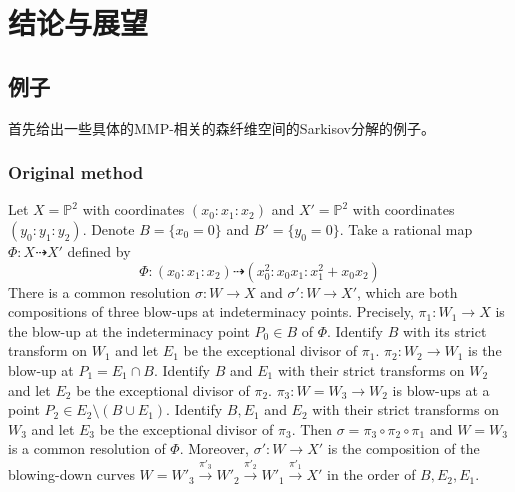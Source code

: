 \chapter{结论与展望}

\section{例子}
首先给出一些具体的MMP-相关的森纤维空间的Sarkisov分解的例子。

\subsection{Original method}\label{example1}
Let $ X=\mathbb{P}^2 $ with coordinates $ (x_0:x_1:x_2) $ and $ X'=\mathbb{P}^2 $ with coordinates $ (y_0:y_1:y_2) $.
Denote $ B=\{x_0=0\} $ and $B'=\{y_{0}=0\} $.
Take a rational map $ \Phi:X\dashrightarrow X' $ defined by
\[ \Phi:(x_0:x_1:x_2)\dashrightarrow (x_0^2:x_0x_1:x_1^2+x_0x_2) \]
There is a  common resolution $\sigma: W\to X$ and $\sigma':W\to X'$, which are both compositions of three blow-ups at indeterminacy points.
Precisely, $\pi_{1}:W_{1}\to X$ is the blow-up at the indeterminacy point $P_{0} \in B$ of $\Phi$. Identify $B$ with its strict transform on $W_{1}$ and let $E_{1}$ be the exceptional divisor of $\pi_{1}$.
$\pi_{2}:W_{2}\to W_{1}$ is the blow-up at $P_{1}=E_{1} \cap B$. Identify $B$ and $E_{1}$ with their strict transforms on $W_{2}$ and let $E_{2}$ be the exceptional divisor of $\pi_{2}$.
$\pi_{3}:W=W_{3}\to W_{2}$ is blow-ups at a point $P_{2} \in E_{2} \setminus (B\cup E_{1})$. Identify  $B, E_{1}$ and $E_{2}$ with their strict transforms   on $W_{3}$ and let $E_{3}$ be the exceptional divisor of $\pi_{3}$.
Then $ \sigma=\pi_{3}\circ \pi_{2} \circ \pi_{1} $ and $ W=W_3 $ is a common resolution of $\Phi$. Moreover, $ \sigma':W\to X' $ is the composition of the blowing-down curves  $W=W'_{3}\xrightarrow{\pi'_{3}} W'_{2}\xrightarrow{\pi'_{2}} W'_{1} \xrightarrow{\pi'_{1}} X'$ in the order of $ B,E_2,E_1 $.

